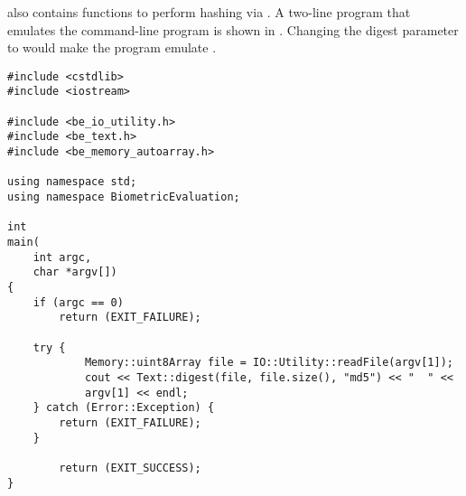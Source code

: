  also contains functions to perform  hashing via .
A two-line program that emulates the command-line  program is
shown in .  Changing the digest parameter to
 would make the program emulate .

\begin{lstlisting}[caption={\code{md5sum} via \sname}, label=text-digest]
#include <cstdlib>
#include <iostream>

#include <be_io_utility.h>
#include <be_text.h>
#include <be_memory_autoarray.h>

using namespace std;
using namespace BiometricEvaluation;

int
main(
    int argc,
    char *argv[])
{
	if (argc == 0)
		return (EXIT_FAILURE);
	
	try {
	        Memory::uint8Array file = IO::Utility::readFile(argv[1]);
	        cout << Text::digest(file, file.size(), "md5") << "  " <<
		    argv[1] << endl;
	} catch (Error::Exception) {
		return (EXIT_FAILURE);
	}

        return (EXIT_SUCCESS);
}
\end{lstlisting}


